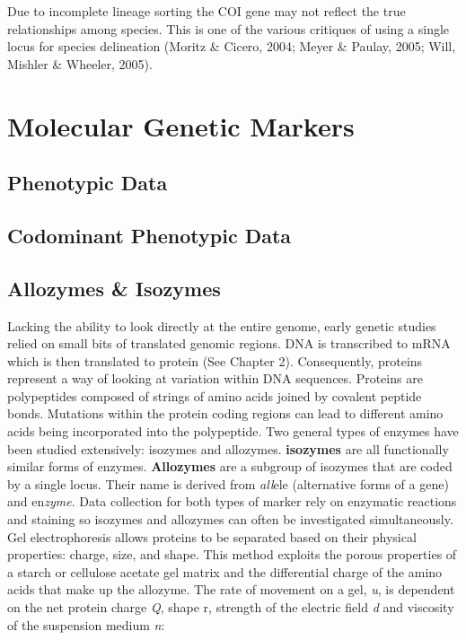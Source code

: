 \documentclass{report}\usepackage[]{graphicx}\usepackage[]{color}
\begin{document}
Due to incomplete lineage sorting the COI gene may not reflect the true relationships among species. 
This is one of the various critiques of using a single locus for species delineation 
(Moritz \& Cicero, 2004; Meyer \& Paulay, 2005; Will, Mishler \& Wheeler, 2005). 


\chapter{Molecular Genetic Markers}

\section{Phenotypic Data}

\section{Codominant Phenotypic Data}

\section{Allozymes \& Isozymes}
Lacking the ability to look directly at the entire genome, early genetic studies relied on small bits of translated 
genomic regions. DNA is transcribed to mRNA which is then translated to protein (See Chapter 2). Consequently,
proteins represent a way of looking at variation within DNA sequences. Proteins are polypeptides 
composed of strings of amino acids joined by covalent peptide bonds. Mutations within the protein coding 
regions can lead to different amino acids being incorporated into the polypeptide. Two general types of enzymes 
have been studied extensively:  isozymes and allozymes.  \textbf{isozymes} are all functionally similar forms of 
enzymes. \textbf{Allozymes} are a subgroup of isozymes that are coded by a single locus. 
Their name is derived from \textit{all}ele (alternative forms of a gene) and en\textit{zyme}. Data collection for 
both types of marker rely on enzymatic reactions and staining so isozymes and allozymes can often be 
investigated simultaneously.
Gel electrophoresis allows proteins to be separated based on their physical properties: charge, size, and shape. 
This method exploits the porous properties of a starch or cellulose acetate gel matrix and the differential charge 
of the amino acids that make up the allozyme. The rate of movement on a gel, \textit{u}, is dependent on the net
protein charge \textit{Q}, shape {r}, strength of the electric field \textit{d} and viscosity of the suspension 
medium \textit{n}:
\end{document}

